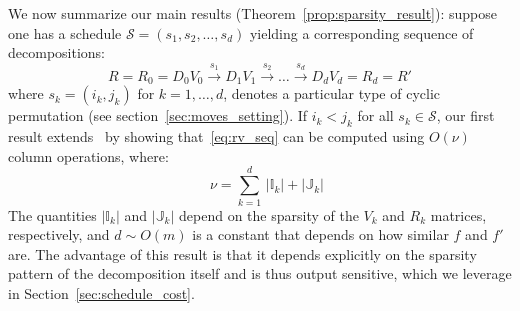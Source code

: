 \documentclass[sn-mathphys]{sn-jnl}
\begin{document}
We now summarize our main results (Theorem~\ref{prop:sparsity_result}): suppose one has a  schedule  $\mathcal{S} = \left( s_1, s_2, \dots, s_d \right)$ yielding a corresponding sequence of decompositions:
  \begin{equation}\label{eq:rv_seq}
   	R = R_0 = D_0 V_0 \overset{s_1}{\to} D_1 V_{1} \overset{s_2}{\to} \dots \overset{s_d}{\to} D_d V_{d} = R_d = R'
 \end{equation}
 where  $s_k = (i_k, j_k)$ for $k=1,\ldots, d$,  denotes a particular type of cyclic permutation (see section~\ref{sec:moves_setting}). If $i_k < j_k$ for all $s_k \in \mathcal{S}$, our first result extends~\cite{busaryev2010tracking} by showing that~\eqref{eq:rv_seq} can be computed  using $O(\nu)$ column operations, where: 
\begin{equation}
	\quad \nu = \sum\limits_{k = 1}^d \, \lvert \mathbb{I}_{k}\rvert + \lvert \mathbb{J}_{k}\rvert 
\end{equation}
The quantities $\lvert \mathbb{I}_{k} \rvert$ and $\lvert \mathbb{J}_{k} \rvert$ depend on the sparsity of the $V_k$ and $R_k$ matrices, respectively, and $d \sim O(m)$ is a constant that depends on how similar $f$ and $f'$ are. The advantage of this result is that it depends explicitly on the sparsity pattern of the decomposition itself and is thus output sensitive, which we leverage in Section~\ref{sec:schedule_cost}. 
\end{document}
